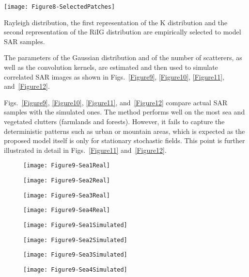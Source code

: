 \documentclass[journal]{IEEEtran}
\begin{document}
\begin{figure*}[hbt]
\centering
\texttt{[image: Figure8-SelectedPatches]}
\caption{Texture patches from SAR images}\label{Figure8-SelectedPatches}
\end{figure*}

Rayleigh distribution, the first representation of the K distribution and the second representation of the RiIG distribution are empirically selected to model SAR samples.

The parameters of the Gaussian distribution and of the number of scatterers, as well as the convolution kernels, are estimated and then used to simulate correlated SAR images as shown in Figs.~\ref{Figure9}, \ref{Figure10}, \ref{Figure11}, and~\ref{Figure12}.

Figs.~\ref{Figure9}, \ref{Figure10}, \ref{Figure11}, and~\ref{Figure12} compare actual SAR samples with the simulated ones.
The method performs well on the most sea and vegetated clutters (farmlands and forests).
However, it fails to capture the deterministic patterns such as urban or mountain areas, which is expected as the proposed model itself is only for stationary stochastic fields.
This point is further illustrated in detail in Figs.~\ref{Figure11} and~\ref{Figure12}.

\begin{figure*}[hbt]
\centering
\begin{subfigure}[t]{4 cm}
	\centering
	\texttt{[image: Figure9-Sea1Real]}
\end{subfigure}
\quad
\begin{subfigure}[t]{4 cm}
	\centering
	\texttt{[image: Figure9-Sea2Real]}
\end{subfigure}
\quad
\begin{subfigure}[t]{4 cm}
	\centering
	\texttt{[image: Figure9-Sea3Real]}
\end{subfigure}
\quad
\begin{subfigure}[t]{4 cm}
	\centering
	\texttt{[image: Figure9-Sea4Real]}
\end{subfigure}
\quad
\begin{subfigure}[t]{4 cm}
	\centering
	\texttt{[image: Figure9-Sea1Simulated]}
\end{subfigure}
\quad
\begin{subfigure}[t]{4 cm}
	\centering
	\texttt{[image: Figure9-Sea2Simulated]}
\end{subfigure}
\quad
\begin{subfigure}[t]{4 cm}
	\centering
	\texttt{[image: Figure9-Sea3Simulated]}
\end{subfigure}
\quad
\begin{subfigure}[t]{4 cm}
	\centering
	\texttt{[image: Figure9-Sea4Simulated]}
\end{subfigure}
\caption{Comparison of real (top row) and simulated (bottom row) SAR textures of various scenarios acquired by different systems, from left to right: Sea1, Sea2, Sea3 and Sea4 as labeled in Fig.~\ref{Figure8-SelectedPatches}}\label{Figure9}
\end{figure*}
\end{document}
